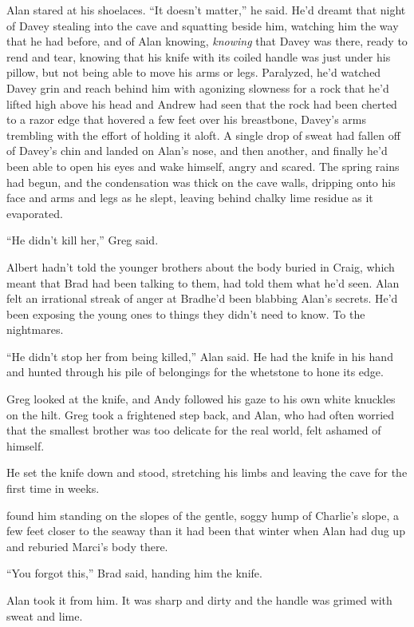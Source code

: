 Alan stared at his shoelaces.  ``It doesn't matter,'' he said.  He'd
dreamt that night of Davey stealing into the cave and squatting beside
him, watching him the way that he had before, and of Alan knowing,
\textit{knowing} that Davey was there, ready to rend and tear, knowing
that his knife with its coiled handle was just under his pillow, but
not being able to move his arms or legs.  Paralyzed, he'd watched
Davey grin and reach behind him with agonizing slowness for a rock
that he'd lifted high above his head and Andrew had seen that the rock
had been cherted to a razor edge that hovered a few feet over his
breastbone, Davey's arms trembling with the effort of holding it
aloft.  A single drop of sweat had fallen off of Davey's chin and
landed on Alan's nose, and then another, and finally he'd been able to
open his eyes and wake himself, angry and scared.  The spring rains
had begun, and the condensation was thick on the cave walls, dripping
onto his face and arms and legs as he slept, leaving behind chalky
lime residue as it evaporated.

``He didn't kill her,'' Greg said.

Albert hadn't told the younger brothers about the body buried in
Craig, which meant that Brad had been talking to them, had told them
what he'd seen.  Alan felt an irrational streak of anger at
Brad\dash{}he'd been blabbing Alan's secrets.  He'd been exposing the
young ones to things they didn't need to know.  To the nightmares.

``He didn't stop her from being killed,'' Alan said.  He had the knife
in his hand and hunted through his pile of belongings for the
whetstone to hone its edge.

Greg looked at the knife, and Andy followed his gaze to his own white
knuckles on the hilt.  Greg took a frightened step back, and Alan, who
had often worried that the smallest brother was too delicate for the
real world, felt ashamed of himself.

He set the knife down and stood, stretching his limbs and leaving the
cave for the first time in weeks.

 found him standing on the slopes of the gentle, soggy hump of
Charlie's slope, a few feet closer to the seaway than it had been that
winter when Alan had dug up and reburied Marci's body there.

``You forgot this,'' Brad said, handing him the knife.

Alan took it from him.  It was sharp and dirty and the handle was
grimed with sweat and lime.

